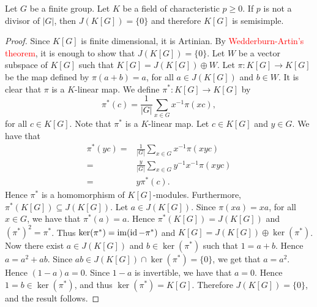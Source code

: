 
\begin{theorem}
Let $G$ be a finite group. Let $K$ be a field of characteristic $p\geq 0$. If $p$ is not a divisor of $|G|$, then $J(K[G])=\{0\}$ and therefore $K[G]$ is semisimple.
\end{theorem}

\begin{proof}
    Since $K[G]$ is finite dimensional, it is Artinian. By \textcolor{red}{Wedderburn-Artin's theorem}, it is enough to show that $J(K[G])=\{ 0\}$. Let $W$ be a vector subspace of $K[G]$ such that
    $K[G]=J(K[G])\oplus W$. Let $\pi\colon K[G]\rightarrow K[G]$ be the map defined by $\pi(a+b)=a$, for all $a\in J(K[G])$ and $b\in W$.
    It is clear that $\pi$ is a $K$-linear map. We define $\pi^*\colon K[G]\rightarrow K[G]$ by
    \[\pi^*(c)=\frac{1}{|G|}\sum_{x\in G}x^{-1}\pi(xc),\]
    for all $c\in K[G]$. Note that $\pi^*$ is a $K$-linear map. Let $c\in K[G]$ and $y\in G$. We have that
    \begin{align*}
        \pi^*(yc)=&\frac{1}{|G|}\sum_{x\in G}x^{-1}\pi(xyc)\\
        =&\frac{y}{|G|}\sum_{x\in G}y^{-1}x^{-1}\pi(xyc)\\
        =& y\pi^*(c).
    \end{align*}
    Hence $\pi^*$ is a homomorphism of $K[G]$-modules. Furthermore, $\pi^*(K[G])\subseteq J(K[G])$. Let $a\in J(K[G])$. Since
    $\pi(xa)=xa$, for all $x\in G$, we have that $\pi^*(a)=a$. Hence $\pi^*(K[G])=J(K[G])$ and $(\pi^*)^2=\pi^*$. Thus $\ker(\pi^*)=\operatorname{im}(\operatorname{id}-\pi^*)$ and $K[G]=J(K[G])\oplus \ker(\pi^*)$. Now there exist $a\in J(K[G])$ and $b\in \ker(\pi^*)$ such that
    $1=a+b$. Hence $a=a^2+ab$. Since $ab\in J(K[G])\cap\ker(\pi^*)=\{ 0\}$, we get that $a=a^2$. Hence $(1-a)a=0$. Since $1-a$ is invertible, we have that $a=0$. Hence $1=b\in \ker(\pi^*)$, and thus $\ker(\pi^*)=K[G]$. Therefore $J(K[G])=\{ 0\}$, and the result follows. 
\end{proof}


